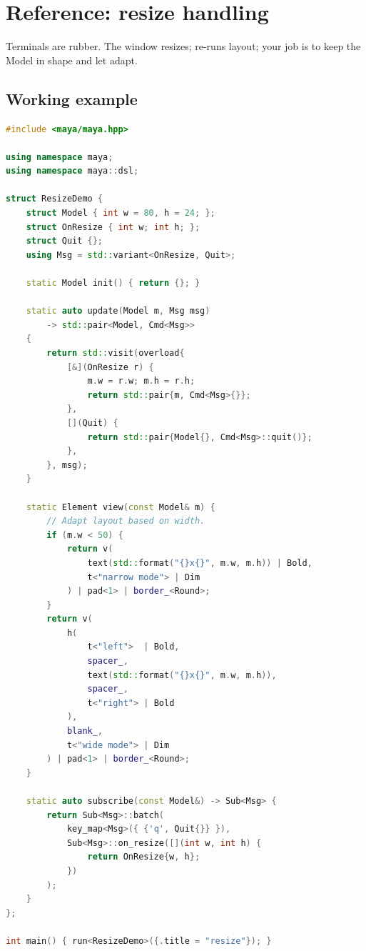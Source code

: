 \chapter{Reference: resize handling}
\label{ch:refman-resize}

\begin{aside}
Terminals are rubber. The window resizes; \maya{} re-runs
layout; your job is to keep the Model in shape and let
 adapt.
\end{aside}

\section{Working example}

\begin{lstlisting}[language=C++]
#include <maya/maya.hpp>

using namespace maya;
using namespace maya::dsl;

struct ResizeDemo {
    struct Model { int w = 80, h = 24; };
    struct OnResize { int w; int h; };
    struct Quit {};
    using Msg = std::variant<OnResize, Quit>;

    static Model init() { return {}; }

    static auto update(Model m, Msg msg)
        -> std::pair<Model, Cmd<Msg>>
    {
        return std::visit(overload{
            [&](OnResize r) {
                m.w = r.w; m.h = r.h;
                return std::pair{m, Cmd<Msg>{}};
            },
            [](Quit) {
                return std::pair{Model{}, Cmd<Msg>::quit()};
            },
        }, msg);
    }

    static Element view(const Model& m) {
        // Adapt layout based on width.
        if (m.w < 50) {
            return v(
                text(std::format("{}x{}", m.w, m.h)) | Bold,
                t<"narrow mode"> | Dim
            ) | pad<1> | border_<Round>;
        }
        return v(
            h(
                t<"left">  | Bold,
                spacer_,
                text(std::format("{}x{}", m.w, m.h)),
                spacer_,
                t<"right"> | Bold
            ),
            blank_,
            t<"wide mode"> | Dim
        ) | pad<1> | border_<Round>;
    }

    static auto subscribe(const Model&) -> Sub<Msg> {
        return Sub<Msg>::batch(
            key_map<Msg>({ {'q', Quit{}} }),
            Sub<Msg>::on_resize([](int w, int h) {
                return OnResize{w, h};
            })
        );
    }
};

int main() { run<ResizeDemo>({.title = "resize"}); }
\end{lstlisting}

